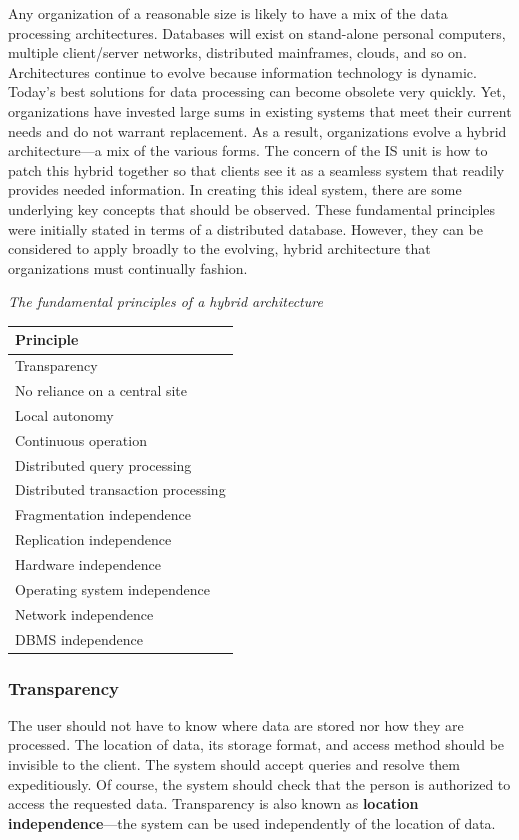 \documentclass[
]{article}
\begin{document}
Any organization of a reasonable size is likely to have a mix of the
data processing architectures. Databases will exist on stand-alone
personal computers, multiple client/server networks, distributed
mainframes, clouds, and so on. Architectures continue to evolve because
information technology is dynamic. Today's best solutions for data
processing can become obsolete very quickly. Yet, organizations have
invested large sums in existing systems that meet their current needs
and do not warrant replacement. As a result, organizations evolve a
hybrid architecture---a mix of the various forms. The concern of the IS
unit is how to patch this hybrid together so that clients see it as a
seamless system that readily provides needed information. In creating
this ideal system, there are some underlying key concepts that should be
observed. These fundamental principles were initially stated in terms of
a distributed database. However, they can be considered to apply broadly
to the evolving, hybrid architecture that organizations must continually
fashion.

\emph{The fundamental principles of a hybrid architecture}

\begin{longtable}[]{@{}l@{}}
\toprule
Principle \\
\midrule
\endhead
Transparency \\
No reliance on a central site \\
Local autonomy \\
Continuous operation \\
Distributed query processing \\
Distributed transaction processing \\
Fragmentation independence \\
Replication independence \\
Hardware independence \\
Operating system independence \\
Network independence \\
DBMS independence \\
\bottomrule
\end{longtable}

\hypertarget{transparency}{%
\subsubsection*{Transparency}\label{transparency}}

The user should not have to know where data are stored nor how they are
processed. The location of data, its storage format, and access method
should be invisible to the client. The system should accept queries and
resolve them expeditiously. Of course, the system should check that the
person is authorized to access the requested data. Transparency is also
known as \textbf{location independence}---the system can be used
independently of the location of data.
\end{document}
